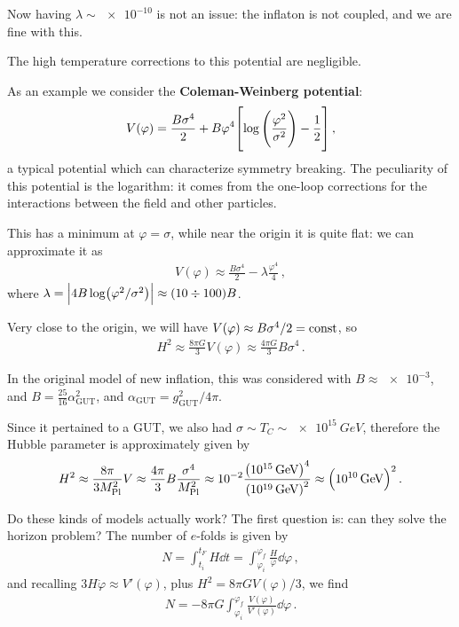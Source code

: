 \documentclass[main.tex]{subfiles}
\begin{document}
Now having \(\lambda \sim \num{e-10}\) is not an issue: the inflaton is not coupled, and we are fine with this. 

The high temperature corrections to this potential are negligible.

As an example we consider the \textbf{Coleman-Weinberg potential}: 
%
\begin{align}
V(\varphi ) = \frac{B \sigma^{4}}{2}
+ B \varphi^{4} \qty[\log \qty(\frac{\varphi^2}{\sigma^2}) - \frac{1}{2}]
\,,
\end{align}
%
a typical potential which can characterize symmetry breaking. 
The peculiarity of this potential is the logarithm: it comes from the one-loop corrections for the interactions between the field and other particles. 

This has a minimum at \(\varphi = \sigma \), while near the origin it is quite flat: we can approximate it as 
%
\begin{align}
V(\varphi ) \approx \frac{B \sigma^{4}}{2} - \lambda \frac{\varphi^{4}}{4} 
\,,
\end{align}
%
where \(\lambda = \abs{4 B \log (\varphi^2 / \sigma^2)} \approx \qty(\num{10} \divisionsymbol \num{100}) B\). 

Very close to the origin, we will have \(V(\varphi ) \approx B \sigma^{4} / 2 = \text{const}\), so 
%
\begin{align}
H^2 \approx \frac{8 \pi G}{3} V(\varphi ) \approx \frac{4 \pi G}{3} B \sigma^{4}
\,.
\end{align}

In the original model of new inflation, this was considered with \(B \approx \num{e-3}\), and \(B = \frac{25}{16} \alpha^2 _{\text{GUT}}\), and \(\alpha _{\text{GUT}} = g _{\text{GUT}}^2 / 4 \pi \). 

Since it pertained to a GUT, we also had \(\sigma \sim T_C \sim \SI{e15}{GeV}\), therefore the Hubble parameter is approximately given by 
%
\begin{align}
H^2 \approx \frac{8 \pi }{3 M _{\text{Pl}}^2} V 
\approx \frac{4 \pi }{3} B \frac{\sigma^{4}}{M _{\text{Pl}}^2}
\approx \num{e-2} \frac{\qty(\SI{e15}{GeV})^{4}}{\qty(\SI{e19}{GeV})^{2}} \approx \qty(\SI{e10}{GeV})^2
\,.
\end{align}

Do these kinds of models actually work? The first question is: can they solve the horizon problem? The number of \(e\)-folds is given by 
%
\begin{align}
N = \int _{t_i}^{t_F} H \dd{t} = \int_{\varphi _i}^{\varphi _f} \frac{H}{\dot{\varphi}} \dd{\varphi }
\,,
\end{align}
%
and recalling \(3 H \dot{\varphi} \approx V' (\varphi )\), plus \(H^2= 8 \pi G V(\varphi ) /3\), we find 
%
\begin{align}
N = - 8 \pi G \int_{\varphi _i}^{\varphi _f} \frac{V(\varphi )}{V'(\varphi )} \dd{\varphi }
\,.
\end{align}
\end{document}
